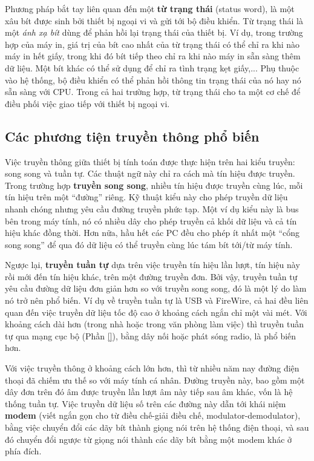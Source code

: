 Phương pháp bắt tay liên quan đến một \textbf{từ trạng thái} (status word), là một xâu bít
được sinh bởi thiết bị ngoại vi và gửi tới bộ điều khiển. Từ trạng thái là một \textit{ánh
  xạ bít} dùng để phản hồi lại trạng thái của thiết bị. Ví dụ, trong trường hợp của máy
in, giá trị của bít cao nhất của từ trạng thái có thể chỉ ra khi nào máy in hết giấy,
trong khi đó bít tiếp theo chỉ ra khi nào máy in sẵn sàng thêm dữ liệu. Một bít khác có
thể sử dụng để chỉ ra tình trạng kẹt giấy,... Phụ thuộc vào hệ thống, bộ điều khiển có thể
phản hồi thông tin trạng thái của nó hay nó sẵn sàng với CPU. Trong cả hai trường hợp, từ
trạng thái cho ta một cơ chế để điều phối việc giao tiếp với thiết bị ngoại vi.

\subsection*{Các phương tiện truyền thông  phổ biến}
Việc truyền thông giữa thiết bị tính toán được thực hiện trên hai kiểu truyền: song song
và tuần tự. Các thuật ngữ này chỉ ra cách mà tín hiệu được truyền. Trong trường hợp
\textbf{truyền song song}, nhiều tín hiệu được truyền cùng lúc, mỗi tín hiệu trên một
``đường'' riêng. Kỹ thuật kiểu này cho phép truyền dữ liệu nhanh chóng nhưng yêu cầu đường
truyền phức tạp. Một ví dụ kiểu này là bus bên trong máy tính, nó có nhiều dây cho phép
truyền cả khối dữ liệu và cả tín hiệu khác đồng thời. Hơn nữa, hầu hết các PC đều cho phép
ít nhất một ``cổng song song'' để qua đó dữ liệu có thể truyền cùng lúc tám bít tới/từ máy
tính.

Ngược lại, \textbf{truyền tuần tự} dựa trên việc truyền tín hiệu lần lượt, tín hiệu này
rồi mới đến tín hiệu khác, trên một đường truyền đơn. Bởi vậy, truyền tuần tự yêu cầu
đường dữ liệu đơn giản hơn so với truyền song song, đó là một lý do làm nó trở nên phổ
biến. Ví dụ về truyền tuần tự là USB và FireWire, cả hai đều liên quan đến việc truyền dữ
liệu tốc độ cao ở khoảng cách ngắn chỉ một vài mét. Với khoảng cách dài hơn (trong nhà
hoặc trong văn phòng làm việc) thì truyền tuần tự qua mạng cục bộ (Phần \ref{}), bằng dây
nối hoặc phát sóng radio, là phổ biến hơn.

Với việc truyền thông ở khoảng cách lớn hơn, thì từ nhiều năm nay đường điện thoại đã
chiếm ưu thế so với máy tính cá nhân. Đường truyền này, bao gồm một dây đơn trên đó âm
được truyền lần lượt âm này tiếp sau âm khác, vốn là hệ thống tuần tự. Việc truyền dữ liệu
số trên các đường này dẫn tới khái niệm \textbf{modem} (viết ngắn gọn cho từ điều chế-giải
điều chế, modulator-demodulator), bằng việc chuyển đổi các dãy bít thành giọng nói trên hệ
thống điện thoại, và sau đó chuyển đổi ngược từ giọng nói thành các dãy bít bằng một modem
khác ở phía đích.

